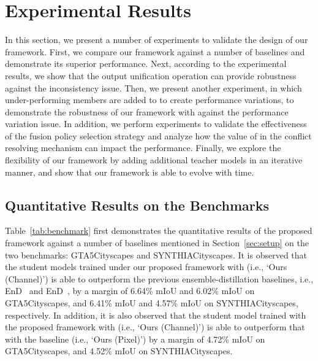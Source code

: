 \documentclass[final]{cvpr}
\begin{document}
\section{Experimental Results}
\label{sec:experiments}
In this section, we present a number of experiments to validate the design of our framework. First, we compare our framework against a number of baselines and demonstrate its superior performance. Next, according to the experimental results, we show that the output unification operation can provide robustness against the inconsistency issue. Then, we present another experiment, in which under-performing members are added to  to create performance variations, to demonstrate the robustness of our framework with  against the performance variation issue. In addition, we perform experiments to validate the effectiveness of the fusion policy selection strategy and analyze how the value of  in the conflict resolving mechanism can impact the performance. Finally, we explore the flexibility of our framework by adding additional teacher models in an iterative manner, and show that our framework is able to evolve with time.

\subsection{Quantitative Results on the Benchmarks}
\label{sec:experiments:benchmark}
Table~\ref{tab:benchmark} first demonstrates the quantitative results of the proposed framework against a number of baselines mentioned in Section~\ref{sec:setup} on the two benchmarks: GTA5Cityscapes and SYNTHIACityscapes. It is observed that the student models trained under our proposed framework with  (i.e., `Ours (Channel)') is able to outperform the previous ensemble-distillation baselines, i.e., EnD~\cite{hinton2015distilling} and EnD~\cite{malinin2019ensemble}, by a margin of 6.64\% mIoU and 6.02\% mIoU on GTA5Cityscapes, and 6.41\% mIoU and 4.57\% mIoU on SYNTHIACityscapes, respectively. In addition, it is also observed that the student model trained with the proposed framework with  (i.e., `Ours (Channel)') is able to outperform that with the baseline  (i.e., `Ours (Pixel)') by a margin of 4.72\% mIoU on GTA5Cityscapes, and 4.52\% mIoU on SYNTHIACityscapes. 
\end{document}
